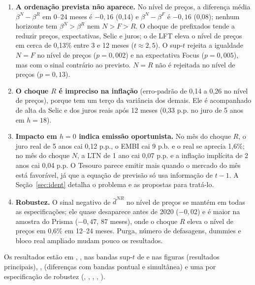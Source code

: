 \documentclass[12pt,a4paper]{article}
\begin{document}
\begin{enumerate}[leftmargin=1.2cm]
    \item \textbf{A ordenação prevista não aparece.} No nível de preços, a diferença
    média \(\beta^N-\beta^R\) em 0--24 meses é \(-0{,}16\) (0,14) e
    \(\beta^N-\beta^F\) é \(-0{,}16\) (0,08); nenhum horizonte tem \(\beta^N>\beta^R\)
    nem \(N>F>R\). O choque de prefixados tende a reduzir preços, expectativas,
    Selic e juros; o de LFT eleva o nível de preços em cerca de 0,13\% entre 3 e 12
    meses (\(t\approx 2{,}5\)). O sup-\(t\) rejeita a igualdade \(N=F\) no nível de
    preços (\(p=0{,}002\)) e na expectativa Focus (\(p=0{,}005\)), mas com o sinal
    contrário ao previsto. \(N=R\) não é rejeitada no nível de preços (\(p=0{,}13\)).
    \item \textbf{O choque \(R\) é impreciso na inflação} (erro-padrão de 0,14 a 0,26
    no nível de preços), porque tem um terço da variância dos demais. Ele é
    acompanhado de alta da Selic e dos juros reais após 12 meses (0,33 p.p. no juro
    de 5 anos em \(h=18\)).
    \item \textbf{Impacto em \(h=0\) indica emissão oportunista.} No mês do choque
    \(R\), o juro real de 5 anos cai 0,12 p.p., o EMBI cai 9 p.b. e o real se
    aprecia 1,6\%; no mês do choque \(N\), a LTN de 1 ano cai 0,07 p.p. e a
    inflação implícita de 2 anos cai 0,04 p.p. O Tesouro parece emitir mais quando
    o mercado do mês está favorável, já que a equação de previsão só usa
    informação de \(t-1\). A Seção~\ref{sec:ident} detalha o problema e as
    propostas para tratá-lo.
    \item \textbf{Robustez.} O sinal negativo de \(\bar d^{NR}\) no nível de preços se
    mantém em todas as especificações; ele quase desaparece antes de 2020
    (\(-0{,}02\)) e é maior na amostra do Prisma (\(-0{,}47\), 87 meses), onde o
    choque \(R\) eleva o nível de preços em 0,6\% em 12--24 meses. Purga, número de
    defasagens, dummies e bloco real ampliado mudam pouco os resultados.
\end{enumerate}

Os resultados estão em
,
, nas bandas sup-\(t\) de
 e nas figuras
 (resultados principais),
,  (diferenças com bandas pontual e
simultânea) e uma por especificação de robustez (, ,
, , ).
\end{document}
